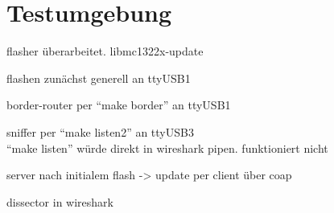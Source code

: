 \section{Testumgebung}

flasher überarbeitet. libmc1322x-update

flashen zunächst generell an ttyUSB1

border-router per "`make border"' an ttyUSB1

sniffer per "`make listen2"' an ttyUSB3\\
"`make listen"' würde direkt in wireshark pipen. funktioniert nicht

server nach initialem flash -> update per client über coap

dissector in wireshark